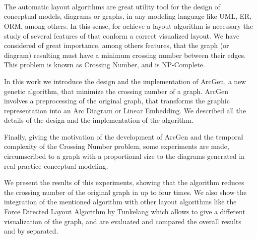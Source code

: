 \ \\
\ \\
\label{pagsumm}
\\
\ \\
\ \\

\ \\

\ \\
\ \\

The automatic layout algorithms are great utility tool for the design of conceptual models, diagrams or graphs, in any modeling language like UML, ER, ORM, among others. In this sense, for achieve a layout algorithm is necessary the study of several features of that conform a correct visualized layout. We have considered of great importance, among others features, that the graph (or diagram) resulting must have a minimum crossing number between their edges. This problem is known as Crossing Number, and is NP-Complete. 

In this work we introduce the design and the implementation of {\sc ArcGen}, a new genetic algorithm, that minimize the crossing number of a graph. {\sc ArcGen} involves a preprocessing of the original graph, that transforms the graphic representation into an Arc Diagram or Linear Embedding. We described all the details of the design and the implementation of the algorithm. 

Finally, giving the motivation of the development of {\sc ArcGen} and the temporal complexity of the Crossing Number problem, some experiments are made, circumscribed to a graph with a proportional size to the diagrams generated in real practice conceptual modeling. 

We present the results of this experiments, showing that the algorithm reduces the crossing number of the original graph in up to four times. We also show the integration of the mentioned algorithm with other layout algorithms like the Force Directed Layout Algorithm by Tunkelang which allows to give a different visualization of the graph, and are evaluated and compared the overall results and by separated.

\vfill
\pagebreak
